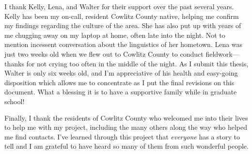 I thank Kelly, Lena, and Walter for their support over the past several years. Kelly has been my on-call, resident Cowlitz County native, helping me confirm my findings regarding the culture of the area. She has also put up with years of me chugging away on my laptop at home, often late into the night. Not to mention incessent conversation about the linguistics of her hometown. Lena was just two weeks old when we flew out to Cowlitz County to conduct fieldwork---thanks for not crying too often in the middle of the night. As I submit this thesis, Walter is only six weeks old, and I'm appreciative of his health and easy-going disposition which allows me to concentrate as I put the final revisions on this document. What a blessing it is to have a supportive family while in graduate school!

Finally, I thank the residents of Cowlitz County who welcomed me into their lives to help me with my project, including the many others along the way who helped me find contacts. I've learned through this project that \textit{everyone} has a story to tell and I am grateful to have heard so many of them from such wonderful people. 
